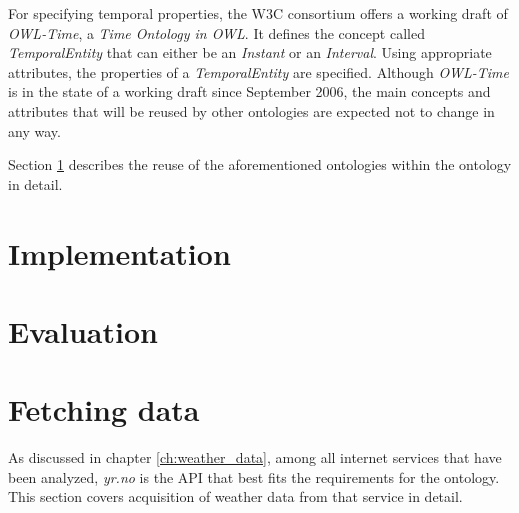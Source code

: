 For specifying temporal properties, the W3C consortium offers a working draft of \emph{OWL-Time}, a \emph{Time Ontology in OWL}. It defines the concept called \emph{TemporalEntity} that can either be an \emph{Instant} or an \emph{Interval}. Using appropriate attributes, the properties of a \emph{TemporalEntity} are specified. Although \emph{OWL-Time} is in the state of a working draft since September 2006, the main concepts and attributes that will be reused by other ontologies are expected not to change in any way.


Section \ref{sec:implementation} describes the reuse of the aforementioned ontologies within the \thinkhomeweather ontology in detail.

\section{Implementation}
\label{sec:implementation}


\section{Evaluation}
\label{ch:ontology_evaluation}


\section{Fetching data}


As discussed in chapter \ref{ch:weather_data}, among all internet services that have been analyzed, \emph{yr.no} is the API that best fits the requirements for the \thinkhomeweather ontology. This section covers acquisition of weather data from that service in detail.


